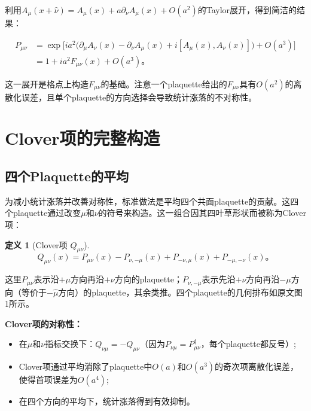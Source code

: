 \documentclass[12pt,a4paper]{ctexart}
\theoremstyle{definition}
\newtheorem{definition}{定义}[section]
\begin{document}
利用$A_\mu(x+\hat{\nu}) = A_\mu(x) + a\partial_\nu A_\mu(x) + O(a^2)$的Taylor展开，得到简洁的结果\cite{NoteGluonPDFs}：

\begin{equation}
\begin{aligned}
P_{\mu\nu} &= \exp\Big[ ia^2\big(\partial_\mu A_\nu(x) - \partial_\nu A_\mu(x) + i[A_\mu(x), A_\nu(x)]\big) + O(a^3) \Big] \\
&= 1 + ia^2 F_{\mu\nu}(x) + O(a^3)。
\end{aligned}
\label{eq:plaquette_to_F}
\end{equation}

这一展开是格点上构造$F_{\mu\nu}$的基础。注意一个plaquette给出的$F_{\mu\nu}$具有$O(a^2)$的离散化误差，且单个plaquette的方向选择会导致统计涨落的不对称性。

\section{Clover项的完整构造}

\subsection{四个Plaquette的平均}

为减小统计涨落并改善对称性，标准做法是平均四个共面plaquette的贡献\cite{NoteGluonPDFs}。这四个plaquette通过改变$\mu$和$\nu$的符号来构造。这一组合因其四叶草形状而被称为Clover项：

\begin{definition}[Clover项 $Q_{\mu\nu}$]\cite{NoteGluonPDFs}
\begin{equation}
\boxed{Q_{\mu\nu}(x) = P_{\mu\nu}(x) - P_{\nu,-\mu}(x) + P_{-\nu,\mu}(x) + P_{-\mu,-\nu}(x)}。
\label{eq:clover_Q}
\end{equation}
\end{definition}

这里$P_{\mu\nu}$表示沿$+\mu$方向再沿$+\nu$方向的plaquette；$P_{\nu,-\mu}$表示先沿$+\nu$方向再沿$-\mu$方向（等价于$-\hat{\mu}$方向）的plaquette，其余类推。四个plaquette的几何排布如原文图1所示。

\textbf{Clover项的对称性：}
\begin{itemize}
    \item 在$\mu$和$\nu$指标交换下：$Q_{\nu\mu} = -Q_{\mu\nu}$（因为$P_{\nu\mu} = P_{\mu\nu}^\dagger$，每个plaquette都反号）;
    \item Clover项通过平均消除了plaquette中$O(a)$和$O(a^3)$的奇次项离散化误差，使得首项误差为$O(a^4)$;
    \item 在四个方向的平均下，统计涨落得到有效抑制。
\end{itemize}
\end{document}
